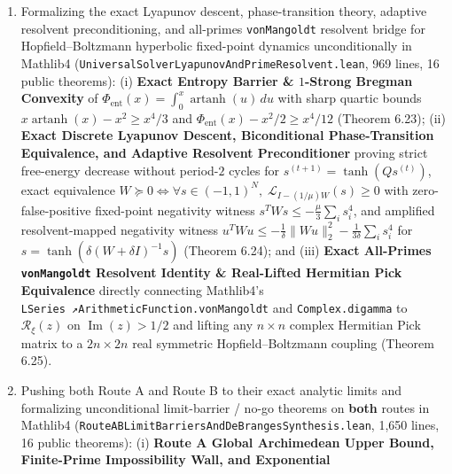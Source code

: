 \documentclass[
  11pt,
]{article}
\begin{document}
\begin{enumerate}
  resolvent (Theorem 6.21); and (iii) \textbf{Route A Exact Continuous
  Even--Odd Decoupling} of \(W_{\text{total}}\) for all \(L > 0\), sharp
  parity Fourier bounds certifying zero-discretization positivity on all
  odd functions (\(0 < L \le 3/10\), \(2.4\times\) wider) and all even
  zero-mean functions (\(0 < L \le 4/9\), \(3.56\times\) wider), plus
  Route B's exact order-6 global cosine bound
  \(1 - x^2/2 + x^4/24 - x^6/720 \le \cos x\) (Theorem 6.22).
\item
  Formalizing the exact Lyapunov descent, phase-transition theory,
  adaptive resolvent preconditioning, and all-primes
  \texttt{vonMangoldt} resolvent bridge for Hopfield--Boltzmann
  hyperbolic fixed-point dynamics unconditionally in Mathlib4
  (\texttt{UniversalSolverLyapunovAndPrimeResolvent.lean}, 969 lines, 16
  public theorems): (i) \textbf{Exact Entropy Barrier \& \(1\)-Strong
  Bregman Convexity} of
  \(\Phi_{\text{ent}}(x) = \int_0^x \operatorname{artanh}(u)\,du\) with
  sharp quartic bounds \(x\operatorname{artanh}(x) - x^2 \ge x^4/3\) and
  \(\Phi_{\text{ent}}(x) - x^2/2 \ge x^4/12\) (Theorem 6.23); (ii)
  \textbf{Exact Discrete Lyapunov Descent, Biconditional
  Phase-Transition Equivalence, and Adaptive Resolvent Preconditioner}
  proving strict free-energy decrease without period-\(2\) cycles for
  \(s^{(t+1)} = \tanh(Q s^{(t)})\), exact equivalence
  \(W \succeq 0 \iff \forall s \in (-1,1)^N,\; \mathcal{L}_{I - (1/\mu)W}(s) \ge 0\)
  with zero-false-positive fixed-point negativity witness
  \(s^T W s \le -\frac{\mu}{3}\sum_i s_i^4\), and amplified
  resolvent-mapped negativity witness
  \(u^T W u \le -\frac{1}{\delta}\|Wu\|_2^2 - \frac{1}{3\delta}\sum_i s_i^4\)
  for \(s = \tanh(\delta(W + \delta I)^{-1} s)\) (Theorem 6.24); and
  (iii) \textbf{Exact All-Primes \texttt{vonMangoldt} Resolvent Identity
  \& Real-Lifted Hermitian Pick Equivalence} directly connecting
  Mathlib4's \texttt{LSeries\ ↗ArithmeticFunction.vonMangoldt} and
  \texttt{Complex.digamma} to \(\mathcal{R}_\xi(z)\) on
  \(\operatorname{Im}(z) > 1/2\) and lifting any \(n \times n\) complex
  Hermitian Pick matrix to a \(2n \times 2n\) real symmetric
  Hopfield--Boltzmann coupling (Theorem 6.25).
\item
  Pushing both Route A and Route B to their exact analytic limits and
  formalizing unconditional limit-barrier / no-go theorems on
  \textbf{both} routes in Mathlib4
  (\texttt{RouteABLimitBarriersAndDeBrangesSynthesis.lean}, 1,650 lines,
  16 public theorems): (i) \textbf{Route A Global Archimedean Upper
  Bound, Finite-Prime Impossibility Wall, and Exponential
}
\end{enumerate}
\end{document}
